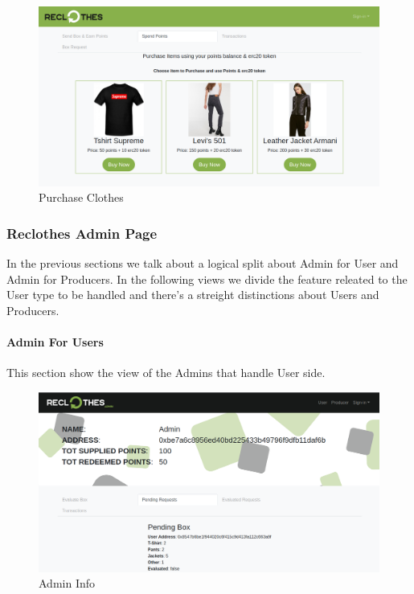 \begin{figure}[h!]
    \centering
    \includegraphics[totalheight=7.5cm]{img/dapp/user-buy.png}
    \caption{Purchase Clothes}
    \label{fig:purchase_clothes}
\end{figure}

\newpage
\subsubsection{Reclothes Admin Page}

In the previous sections we talk about a logical split about Admin for User and Admin for Producers.
In the following views we divide the feature releated to the User type to be handled and there's a 
streight distinctions about Users and Producers.

\paragraph{Admin For Users}

This section show the view of the Admins that handle User side.

\begin{figure}[h!]
    \centering
    \includegraphics[totalheight=7.5cm]{img/dapp/admin-info.png}
    \caption{Admin Info}
    \label{fig:admin_info}
\end{figure}

